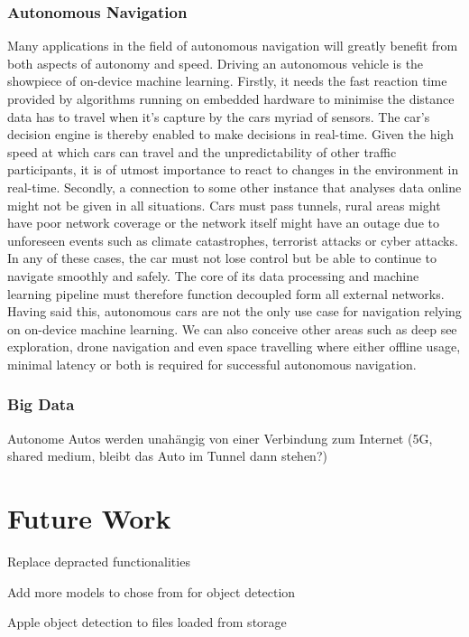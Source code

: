 \documentclass[
			   fontsize=11pt,
               paper=a4,
               bibliography=totoc,
               idxtotoc,
               headsepline,
               footsepline,
               footinclude=false,
               BCOR=12mm,
               DIV=13,
               openany,   %
               ]
               {scrbook}
\begin{document}
\subsubsection{Autonomous Navigation}
Many applications in the field of autonomous navigation will greatly benefit from both aspects of autonomy and speed. Driving an autonomous vehicle is the showpiece of on-device machine learning. Firstly, it needs the fast reaction time provided by algorithms running on embedded hardware to minimise the distance data has to travel when it's capture by the cars myriad of sensors. The car's decision engine is thereby enabled to make decisions in real-time. Given the high speed at which cars can travel and the unpredictability of other traffic participants, it is of utmost importance to react to changes in the environment in real-time. Secondly, a connection to some other instance that analyses data online might not be given in all situations. Cars must pass tunnels, rural areas might have poor network coverage or the network itself might have an outage due to unforeseen events such as climate catastrophes, terrorist attacks or cyber attacks. In any of these cases, the car must not lose control but be able to continue to navigate smoothly and safely. The core of its data processing and machine learning pipeline must therefore function decoupled form all external networks. Having said this, autonomous cars are not the only use case for navigation relying on on-device machine learning. We can also conceive other areas such as deep see exploration, drone navigation and even space travelling where either offline usage, minimal latency or both is required for successful autonomous navigation.

\subsubsection{Big Data}




Autonome Autos werden unahängig von einer Verbindung zum Internet (5G, shared medium, bleibt das Auto im Tunnel dann stehen?)

\section{Future Work}

Replace depracted functionalities

Add more models to chose from for object detection

Apple object detection to files loaded from storage
\end{document}
